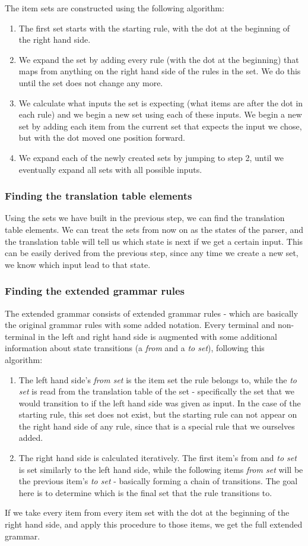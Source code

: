The item sets are constructed using the following algorithm:
\begin{enumerate}
\item The first set starts with the starting rule, with the dot at the beginning of the right hand side.
\item We expand the set by adding every rule (with the dot at the beginning) that maps from anything on the right hand side of the rules in the set. We do this until the set does not change any more.
\item We calculate what inputs the set is expecting (what items are after the dot in each rule) and we begin a new set using each of these inputs. We begin a new set by adding each item from the current set that expects the input we chose, but with the dot moved one position forward.
\item We expand each of the newly created sets by jumping to step 2, until we eventually expand all sets with all possible inputs.
\end{enumerate}
\subsubsection{Finding the translation table elements} 
Using the sets we have built in the previous step, we can find the translation table elements. We can treat the sets from now on as the states of the parser, and the translation table will tell us which state is next if we get a certain input. This can be easily derived from the previous step, since any time we create a new set, we know which input lead to that state.
\subsubsection{Finding the extended grammar rules} 
The extended grammar consists of extended grammar rules - which are basically the original grammar rules with some added notation. Every terminal and non-terminal in the left and right hand side is augmented with some additional information about state transitions (a \textit{from} and a \textit{to set}), following this algorithm:
\begin{enumerate}
\item The left hand side's \textit{from set} is the item set the rule belongs to, while the \textit{to set} is read from the translation table of the set - specifically the set that we would transition to if the left hand side was given as input. In the case of the starting rule, this set does not exist, but the starting rule can not appear on the right hand side of any rule, since that is a special rule that we ourselves added.
\item The right hand side is calculated iteratively. The first item's from and \textit{to set} is set similarly to the left hand side, while the following items \textit{from set} will be the previous item's \textit{to set} - basically forming a chain of transitions. The goal here is to determine which is the final set that the rule transitions to.
\end{enumerate}
If we take every item from every item set with the dot at the beginning of the right hand side, and apply this procedure to those items, we get the full extended grammar.
